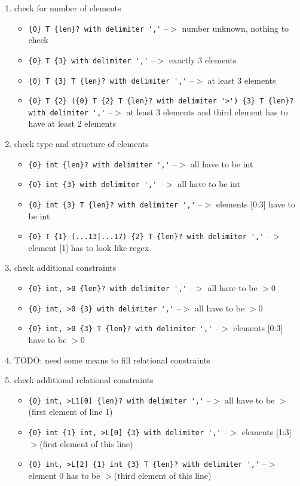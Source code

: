 \documentclass[11pt]{article}
\begin{document}
\begin{enumerate}
\item check for number of elements
\begin{itemize}
\item \verb|{0} T {len}? with delimiter ','| --$>$ number unknown, nothing to check
\item \verb|{0} T {3} with delimiter ','| --$>$ exactly 3 elements
\item \verb|{0} T {3} T {len}? with delimiter ','| --$>$ at least 3 elements
\item \verb|{0} T {2} ({0} T {2} T {len}? with delimiter '>') {3} T {len}? with delimiter ','| --$>$ at least 3 elements and third element has to have at least 2 elements
\end{itemize}
\item check type and structure of elements
\begin{itemize}
\item \verb|{0} int {len}? with delimiter ','| --$>$ all have to be int
\item \verb|{0} int {3} with delimiter ','| --$>$ all have to be int
\item \verb|{0} int {3} T {len}? with delimiter ','| --$>$ elements [0:3] have to be int
\item \verb;{0} T {1} (...13|...17) {2} T {len}? with delimiter ','; --$>$ element [1] has to look like regex
\end{itemize}
\item check additional constraints
\begin{itemize}
\item \verb|{0} int, >0 {len}? with delimiter ','| --$>$ all have to be $>$0
\item \verb|{0} int, >0 {3} with delimiter ','| --$>$ all have to be $>$0
\item \verb|{0} int, >0 {3} T {len}? with delimiter ','| --$>$ elements [0:3] have to be $>$0
\end{itemize}
\item TODO: need some means to fill relational constraints
\item check additional relational constraints
\begin{itemize}
\item \verb|{0} int, >L1[0] {len}? with delimiter ','| --$>$ all have to be $>$(first element of line 1)
\item \verb|{0} int {1} int, >L[0] {3} with delimiter ','| --$>$ elements [1:3] $>$(first element of this line)
\item \verb|{0} int, >L[2] {1} int {3} T {len}? with delimiter ','| --$>$ element 0 has to be $>$(third element of this line)
\end{itemize}
\end{enumerate}
\end{document}

